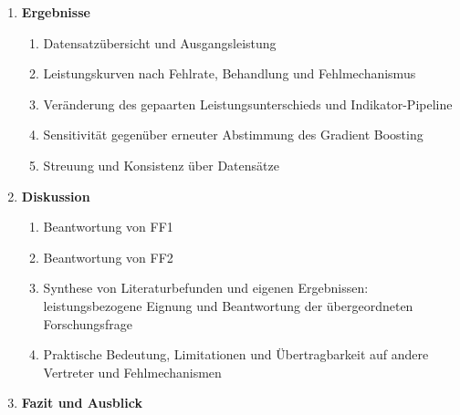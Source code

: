 \documentclass[11pt,a4paper]{article}
\begin{document}
\begin{enumerate}
    \begin{enumerate}
      \item Forschungsdesign und Ableitung aus der Literaturanalyse
      \item Verarbeitungsprinzipien und Auswahl der Vertreter:
            TabPFN-3.5 und LightGBM
      \item Datensatzauswahl, gruppengetrennte Splits identischer Eingaben
            und Vorverarbeitung
      \item Erzeugung fehlender Werte: Fehlmechanismen und Fehlraten
            von 0, 10, 30 und 50 Prozent in allen Partitionen
      \item Interne Verarbeitung, Median-Imputation und Indikator-Zusatzanalyse
      \item Konfigurationen und Tuning-Sensitivität bei 50 Prozent
      \item Wiederholungen, Metriken und gepaarte Auswertung
      \item Pilotlauf, fixierte Software-/Checkpointversionen und Reproduzierbarkeit
    \end{enumerate}
  \item \textbf{Ergebnisse}
    \begin{enumerate}
      \item Datensatzübersicht und Ausgangsleistung
      \item Leistungskurven nach Fehlrate, Behandlung und
            Fehlmechanismus
      \item Veränderung des gepaarten Leistungsunterschieds und Indikator-Pipeline
      \item Sensitivität gegenüber erneuter Abstimmung des Gradient Boosting
      \item Streuung und Konsistenz über Datensätze
    \end{enumerate}
  \item \textbf{Diskussion}
    \begin{enumerate}
      \item Beantwortung von FF1
      \item Beantwortung von FF2
      \item Synthese von Literaturbefunden und eigenen Ergebnissen:
            leistungsbezogene Eignung und Beantwortung der
            übergeordneten Forschungsfrage
      \item Praktische Bedeutung, Limitationen und Übertragbarkeit auf
            andere Vertreter und Fehlmechanismen
    \end{enumerate}
  \item \textbf{Fazit und Ausblick}
\end{enumerate}
\end{document}
